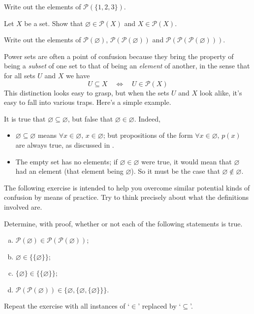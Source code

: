 \begin{exercise}
Write out the elements of $\mathcal{P}(\{1, 2, 3\})$.
\end{exercise}

\begin{exercise}
Let $X$ be a set. Show that $\varnothing \in \mathcal{P}(X)$ and $X \in \mathcal{P}(X)$.
\end{exercise}

\begin{exercise}
Write out the elements of $\mathcal{P}(\varnothing)$, $\mathcal{P}(\mathcal{P}(\varnothing))$ and $\mathcal{P}(\mathcal{P}(\mathcal{P}(\varnothing)))$.
\end{exercise}

Power sets are often a point of confusion because they bring the property of being a \textit{subset} of one set to that of being an \textit{element} of another, in the sense that for all sets $U$ and $X$ we have
\[ U \subseteq X \quad \Leftrightarrow \quad U \in \mathcal{P}(X) \]
This distinction looks easy to grasp, but when the sets $U$ and $X$ look alike, it's easy to fall into various traps. Here's a simple example.

\begin{example}
It is true that $\varnothing \subseteq \varnothing$, but false that $\varnothing \in \varnothing$. Indeed,
\begin{itemize}
\item $\varnothing \subseteq \varnothing$ means $\forall x \in \varnothing,\, x \in \varnothing$; but propositions of the form $\forall x \in \varnothing,\, p(x)$ are always true, as discussed in .
\item The empty set has no elements; if $\varnothing \in \varnothing$ were true, it would mean that $\varnothing$ had an element (that element being $\varnothing$). So it must be the case that $\varnothing \not \in \varnothing$.
\end{itemize}
\end{example}

The following exercise is intended to help you overcome similar potential kinds of confusion by means of practice. Try to think precisely about what the definitions involved are.

\begin{exercise}
Determine, with proof, whether or not each of the following statements is true.
\begin{enumerate}[(a)]
\item $\mathcal{P}(\varnothing) \in \mathcal{P}(\mathcal{P}(\varnothing))$;
\item $\varnothing \in \{ \{ \varnothing \} \}$;
\item $\{ \varnothing \} \in \{ \{ \varnothing \} \}$;
\item $\mathcal{P}(\mathcal{P}(\varnothing)) \in \{ \varnothing, \{ \varnothing, \{ \varnothing \} \} \}$.
\end{enumerate}
Repeat the exercise with all instances of `$\in$' replaced by `$\subseteq$'.
\end{exercise}

